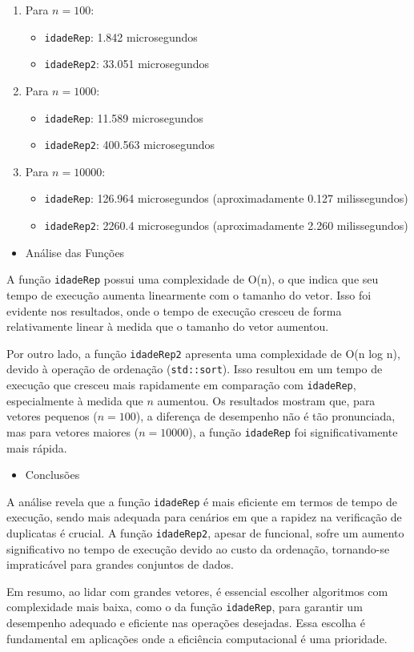 \begin{enumerate}
    \item Para \( n = 100 \):
    \begin{itemize}
        \item \texttt{idadeRep}: 1.842 microsegundos
        \item \texttt{idadeRep2}: 33.051 microsegundos
    \end{itemize}

    \item Para \( n = 1000 \):
    \begin{itemize}
        \item \texttt{idadeRep}: 11.589 microsegundos
        \item \texttt{idadeRep2}: 400.563 microsegundos
    \end{itemize}

    \item Para \( n = 10000 \):
    \begin{itemize}
        \item \texttt{idadeRep}: 126.964 microsegundos (aproximadamente 0.127 milissegundos)
        \item \texttt{idadeRep2}: 2260.4 microsegundos (aproximadamente 2.260 milissegundos)
    \end{itemize}
\end{enumerate}

\begin{itemize}
    \item Análise das Funções
\end{itemize}
A função \texttt{idadeRep} possui uma complexidade de O(n), o que indica que seu tempo de execução aumenta linearmente com o tamanho do vetor. Isso foi evidente nos resultados, onde o tempo de execução cresceu de forma relativamente linear à medida que o tamanho do vetor aumentou.

Por outro lado, a função \texttt{idadeRep2} apresenta uma complexidade de O(n log n), devido à operação de ordenação (\texttt{std::sort}). Isso resultou em um tempo de execução que cresceu mais rapidamente em comparação com \texttt{idadeRep}, especialmente à medida que \( n \) aumentou. Os resultados mostram que, para vetores pequenos (\( n = 100 \)), a diferença de desempenho não é tão pronunciada, mas para vetores maiores (\( n = 10000 \)), a função \texttt{idadeRep} foi significativamente mais rápida.

\begin{itemize}
    \item Conclusões
\end{itemize}
A análise revela que a função \texttt{idadeRep} é mais eficiente em termos de tempo de execução, sendo mais adequada para cenários em que a rapidez na verificação de duplicatas é crucial. A função \texttt{idadeRep2}, apesar de funcional, sofre um aumento significativo no tempo de execução devido ao custo da ordenação, tornando-se impraticável para grandes conjuntos de dados.

Em resumo, ao lidar com grandes vetores, é essencial escolher algoritmos com complexidade mais baixa, como o da função \texttt{idadeRep}, para garantir um desempenho adequado e eficiente nas operações desejadas. Essa escolha é fundamental em aplicações onde a eficiência computacional é uma prioridade.
